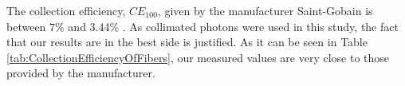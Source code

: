 
The collection efficiency, $CE_{100}$, given by the manufacturer Saint-Gobain is between 7\% and 3.44\% \cite{DataSheetBCF12Fiber}. As collimated photons were used in this study, the fact that our results are in the best side is justified. As it can be seen in Table \ref{tab:CollectionEfficiencyOfFibers}, our measured values are very close to those provided by the manufacturer. %
